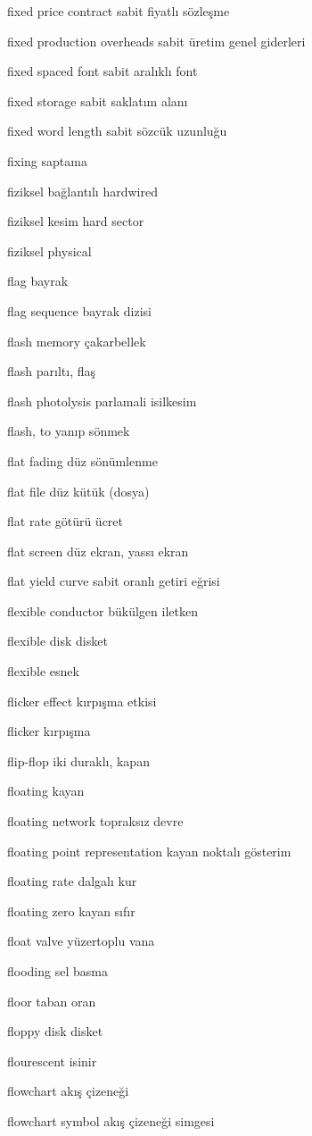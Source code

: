 \documentclass[12pt,fleqn]{article}\usepackage{../../common}
\begin{document}
fixed price contract sabit fiyatlı sözleşme

fixed production overheads sabit üretim genel giderleri

fixed spaced font sabit aralıklı font

fixed storage sabit saklatım alanı

fixed word length sabit sözcük uzunluğu

fixing saptama

fiziksel bağlantılı hardwired

fiziksel kesim hard sector

fiziksel physical

flag bayrak

flag sequence bayrak dizisi

flash memory çakarbellek

flash parıltı, flaş

flash photolysis parlamali isilkesim

flash, to yanıp sönmek

flat fading düz sönümlenme

flat file düz kütük (dosya)

flat rate götürü ücret

flat screen düz ekran, yassı ekran

flat yield curve sabit oranlı getiri eğrisi

flexible conductor bükülgen iletken

flexible disk disket

flexible esnek

flicker effect kırpışma etkisi

flicker kırpışma

flip-flop iki duraklı, kapan

floating kayan

floating network topraksız devre

floating point representation kayan noktalı gösterim

floating rate dalgalı kur

floating zero kayan sıfır

float valve yüzertoplu vana

flooding sel basma

floor taban oran

floppy disk disket

flourescent isinir

flowchart akış çizeneği

flowchart symbol akış çizeneği simgesi
\end{document}
